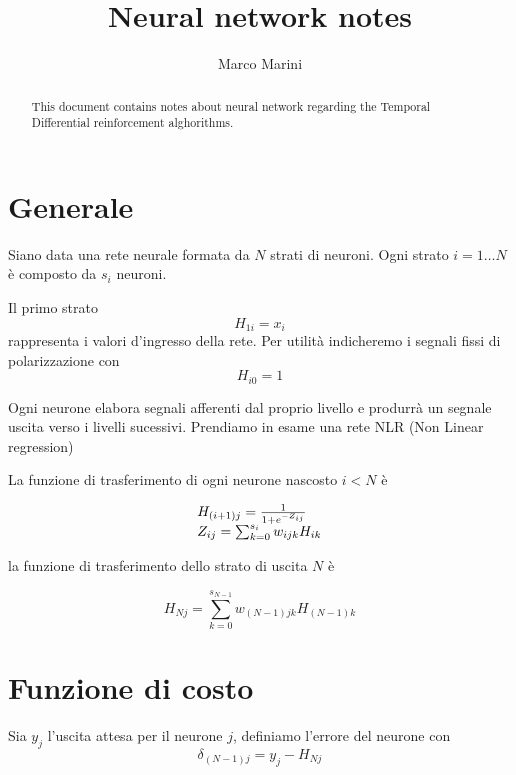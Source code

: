 \documentclass[a4paper,11pt]{article}
\title{Neural network notes}
\author{Marco Marini}
\begin{document}
\maketitle
\tableofcontents

\begin{abstract}
This document contains notes about neural network regarding the Temporal Differential reinforcement alghorithms.
\end{abstract}

\section{Generale}

Siano data una rete neurale formata da $ N $ strati di neuroni.
Ogni strato $ i = 1 \dots N $ è composto da $ s_i $ neuroni.

Il primo strato
\[ H_{1i} = x_i \]
rappresenta i valori d'ingresso della rete.
Per utilità indicheremo i segnali fissi di polarizzazione con
\[ H_{i0} = 1 \]


Ogni neurone elabora segnali afferenti dal proprio livello e produrrà un segnale uscita verso i livelli sucessivi.
Prendiamo in esame una rete NLR (Non Linear regression)

La funzione di trasferimento di ogni neurone nascosto $ i < N $ è

\begin{equation}
\label{hidden}
  \begin{array}l
    H_{(i+1)j} = \frac{1}{1 + e^{-Z_{ij}}}
    \\
    Z_{ij} = \sum_{k=0}^{s_i} w_{ijk} H_{ik}
  \end{array}
\end{equation}

la funzione di trasferimento dello strato di uscita $ N $ è 

\begin{equation}
\label{nlr}
    H_{Nj} = \sum_{k=0}^{s_{N-1}} w_{(N-1)jk} H_{(N-1)k}
\end{equation}

\section{Funzione di costo}

Sia $ y_j $ l'uscita attesa per il neurone $ j $, definiamo l'errore del neurone con
\begin{equation}
\label{delta}
  \delta_{(N-1)j} = y_j - H_{Nj}
\end{equation}
\end{document}
